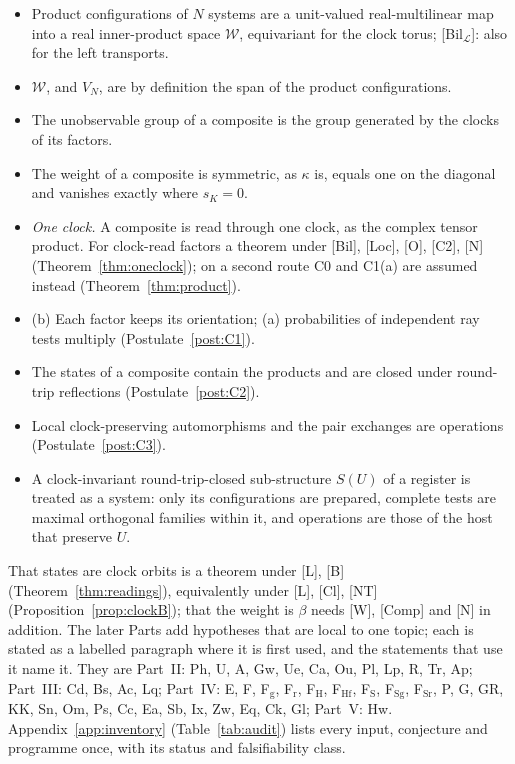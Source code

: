 \documentclass[aps,pra,onecolumn,superscriptaddress,nofootinbib,10pt]{revtex4-2}
\theoremstyle{definition}
\theoremstyle{remark}
\newcommand{\cL}{\mathcal{L}}
\begin{document}
\begin{itemize}[leftmargin=1.6em]
\item[{[Bil]}] Product configurations of $N$ systems are a unit-valued real-multilinear map into a real inner-product space $\mathcal W$, equivariant for the clock torus; [Bil$_\cL$]: also for the left transports.
\item[{[Span]}] $\mathcal W$, and $V_N$, are by definition the span of the product configurations.
\item[{[Loc]}] The unobservable group of a composite is the group generated by the clocks of its factors.
\item[{[O]}] The weight of a composite is symmetric, as $\kappa$ is, equals one on the diagonal and vanishes exactly where $s_K=0$.
\item[{C0}] \emph{One clock.}  A composite is read through one clock, as the complex tensor product.  For clock-read factors a theorem under [Bil], [Loc], [O], [C2], [N] (Theorem~\ref{thm:oneclock}); on a second route C0 and C1(a) are assumed instead (Theorem~\ref{thm:product}).
\item[{C1}] (b) Each factor keeps its orientation; (a) probabilities of independent ray tests multiply (Postulate~\ref{post:C1}).
\item[{C2}] The states of a composite contain the products and are closed under round-trip reflections (Postulate~\ref{post:C2}).
\item[{C3}] Local clock-preserving automorphisms and the pair exchanges are operations (Postulate~\ref{post:C3}).
\item[{[Sub]}] A clock-invariant round-trip-closed sub-structure $S(U)$ of a register is treated as a system: only its configurations are prepared, complete tests are maximal orthogonal families within it, and operations are those of the host that preserve $U$.
\end{itemize}
\noindent That states are clock orbits is a theorem under [L], [B] (Theorem~\ref{thm:readings}), equivalently under [L], [Cl], [NT] (Proposition~\ref{prop:clockB}); that the weight is $\beta$ needs [W], [Comp] and [N] in addition.  The later Parts add hypotheses that are local to one topic; each is stated as a labelled paragraph where it is first used, and the statements that use it name it.  They are Part~II: Ph, U, A, Gw, Ue, Ca, Ou, Pl, Lp, R, Tr, Ap; Part~III: Cd, Bs, Ac, Lq; Part~IV: E, F, F$_{\mathrm g}$, F$_{\mathrm r}$, F$_{\mathrm H}$, F$_{\mathrm{Hf}}$, F$_{\mathrm S}$, F$_{\mathrm{Sg}}$, F$_{\mathrm{Sr}}$, P, G, GR, KK, Sn, Om, Ps, Cc, Ea, Sb, Ix, Zw, Eq, Ck, Gl; Part~V: Hw.  Appendix~\ref{app:inventory} (Table~\ref{tab:audit}) lists every input, conjecture and programme once, with its status and falsifiability class.
\end{document}
